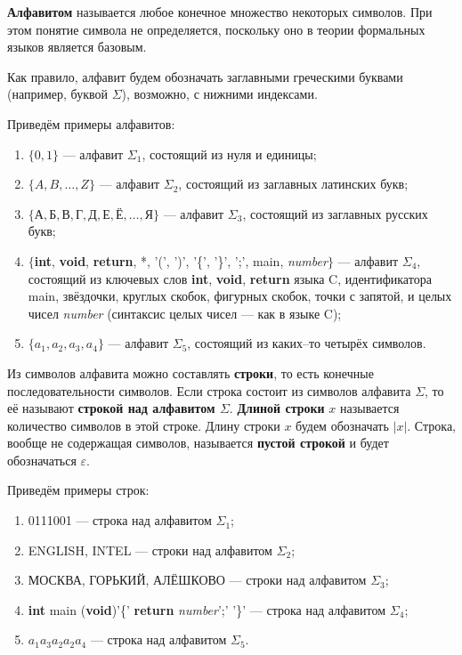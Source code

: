 \documentclass[12pt]{article}
\begin{document}
\textbf{Алфавитом} называется любое конечное множество некоторых символов. При этом понятие символа не определяется, поскольку оно в теории формальных языков является базовым.
 
Как правило, алфавит будем обозначать заглавными греческими буквами (например, буквой $\Sigma$), возможно, с нижними индексами. 
 
Приведём примеры алфавитов:
\begin{enumerate}
\item $\{0,1\}$ --- алфавит $\Sigma_1$, состоящий из нуля и единицы;

\item $\{A,B,\dots,Z\}$ --- алфавит $\Sigma_2$, состоящий из заглавных латинских букв;

\item $\{\text{А},\text{Б},\text{В},\text{Г},\text{Д},\text{Е},\text{Ё},\dots,\text{Я}\}$ --- алфавит $\Sigma_3$, состоящий из заглавных русских букв;

\item 
$\{$\textbf{int}, \textbf{void}, \textbf{return}, *, '(', ')', '\{', '\}', ';', main, \textit{number}$\}$ --- алфавит $\Sigma_4$, состоящий из ключевых слов \textbf{int}, \textbf{void}, \textbf{return} языка C, идентификатора main, звёздочки, круглых скобок, фигурных скобок, точки с запятой, и целых чисел \textit{number} (синтаксис целых чисел --- как в языке C);

\item $\{a_1,a_2,a_3,a_4\}$ --- алфавит $\Sigma_5$, состоящий из каких--то четырёх символов.
\end{enumerate}

Из символов алфавита можно составлять \textbf{строки}, то есть конечные последовательности символов. Если строка состоит из символов алфавита $\Sigma$, то её называют \textbf{строкой над алфавитом $\Sigma$}. \textbf{Длиной строки} $x$ называется количество символов в этой строке. Длину строки $x$ будем обозначать $|x|$. Строка, вообще не содержащая символов, называется \textbf{пустой строкой} и будет обозначаться $\varepsilon$.

Приведём примеры строк:
\begin{enumerate}
\item 0111001 --- строка над алфавитом $\Sigma_1$;

\item ENGLISH, INTEL --- строки над алфавитом $\Sigma_2$;

\item МОСКВА, ГОРЬКИЙ, АЛЁШКОВО --- строки над алфавитом $\Sigma_3$;

\item \textbf{int} main (\textbf{void})'\{' \textbf{return} \textit{number}';' '\}' ---
строка над алфавитом $\Sigma_4$;

\item $a_1a_3a_2a_2a_4$ --- строка над алфавитом $\Sigma_5$. 
\end{enumerate}
\end{document}
